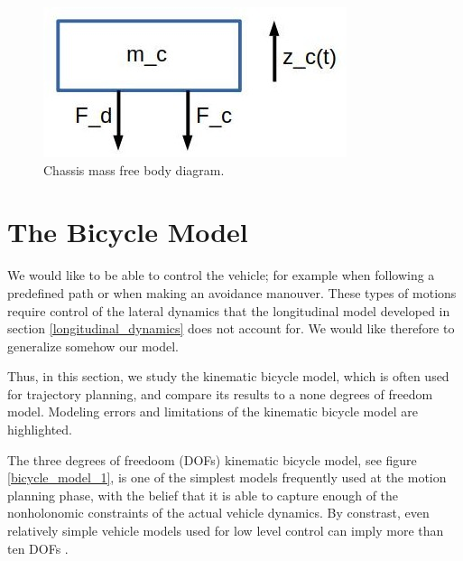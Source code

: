 \begin{figure}[!htb]
\begin{center}
\includegraphics[scale=0.280]{img/model_automotive_sys/suspension_sys_chassis_mass_free_diagram.jpg}
\end{center}
\caption{Chassis mass free body diagram.}
\label{suspension_sys_chassis_mass_free_diagram}
\end{figure}


\section{The Bicycle Model}
\label{bicycle_model}

We would like to be able to control the vehicle; for example when following a predefined path or when making an avoidance manouver. These types of motions
require control of the lateral dynamics that the longitudinal model developed in section \ref{longitudinal_dynamics} does not account for. We would like therefore
to generalize somehow our model.

Thus, in  this  section,  we  study the kinematic bicycle model, which is often used for trajectory planning,  
and  compare  its  results  to  a  none  degrees  of  freedom model. Modeling errors and limitations of the kinematic bicycle model are highlighted. 

The three degrees of freedoom (DOFs) kinematic bicycle model, see figure \ref{bicycle_model_1},  is one
of the simplest models frequently used at the motion planning phase, with the belief that it is able to capture enough of the
nonholonomic constraints of the actual vehicle dynamics. By constrast, even relatively simple vehicle models used for low level  control  can  imply  more  
than  ten DOFs \cite{Polack2017}. 


